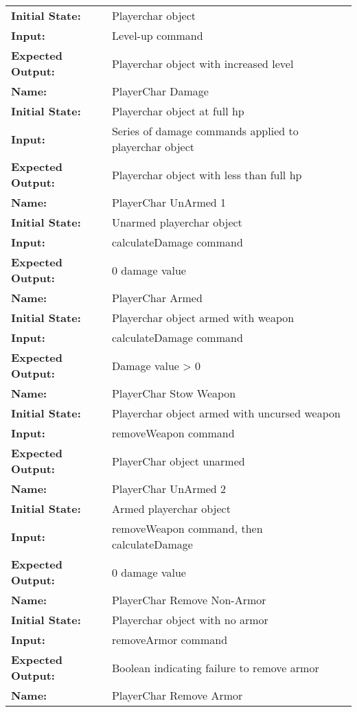 \documentclass[12pt, titlepage]{article}
\begin{document}
\begin{center}
\begin{longtable}{ l | l }
\textbf{Initial State:} & Playerchar object\\
\textbf{Input:} & Level-up command\\
\textbf{Expected Output:} & Playerchar object with increased level\\
\hline
\textbf{Name:} & PlayerChar Damage\\
\textbf{Initial State:} & Playerchar object at full hp\\
\textbf{Input:} & Series of damage commands applied to playerchar object\\
\textbf{Expected Output:} & Playerchar object with less than full hp\\
\hline
\textbf{Name:} & PlayerChar UnArmed 1\\
\textbf{Initial State:} & Unarmed playerchar object\\
\textbf{Input:} & calculateDamage command\\
\textbf{Expected Output:} & 0 damage value\\
\hline
\textbf{Name:} & PlayerChar Armed\\
\textbf{Initial State:} & Playerchar object armed with weapon\\
\textbf{Input:} & calculateDamage command\\
\textbf{Expected Output:} & Damage value > 0\\
\hline
\textbf{Name:} & PlayerChar Stow Weapon\\
\textbf{Initial State:} & Playerchar object armed with uncursed weapon\\
\textbf{Input:} & removeWeapon command\\
\textbf{Expected Output:} & PlayerChar object unarmed\\
\hline
\textbf{Name:} & PlayerChar UnArmed 2\\
\textbf{Initial State:} & Armed playerchar object\\
\textbf{Input:} & removeWeapon command, then calculateDamage\\
\textbf{Expected Output:} & 0 damage value\\
\hline
\textbf{Name:} & PlayerChar Remove Non-Armor\\
\textbf{Initial State:} & Playerchar object with no armor\\
\textbf{Input:} & removeArmor command\\
\textbf{Expected Output:} & Boolean indicating failure to remove armor\\
\hline
\textbf{Name:} & PlayerChar Remove Armor\\

\end{longtable}
\end{center}
\end{document}
